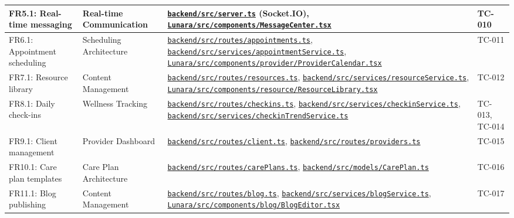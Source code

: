 \documentclass[12pt,letterpaper]{article}
\newcommand{\ghrepo}{https://github.com/omniV1/lunaraCare}
\begin{document}
{\begin{longtable}{|>{\raggedright\arraybackslash}p{2.2cm}|>{\raggedright\arraybackslash}p{2.5cm}|>{\raggedright\arraybackslash}p{5.5cm}|>{\raggedright\arraybackslash}p{2.5cm}|}
\hline
FR5.1: Real-time messaging & Real-time Communication & \href{\ghrepo/blob/main/backend/src/server.ts}{\texttt{backend/src/server.ts}} (Socket.IO), \href{\ghrepo/blob/main/Lunara/src/components/MessageCenter.tsx}{\texttt{Lunara/src/components/MessageCenter.tsx}} & TC-010 \\
\hline
\rowcolor{TableRowAlt}
FR6.1: Appointment scheduling & Scheduling Architecture & \href{\ghrepo/blob/main/backend/src/routes/appointments.ts}{\texttt{backend/src/routes/appointments.ts}}, \href{\ghrepo/blob/main/backend/src/services/appointmentService.ts}{\texttt{backend/src/services/appointmentService.ts}}, \href{\ghrepo/blob/main/Lunara/src/components/provider/ProviderCalendar.tsx}{\texttt{Lunara/src/components/provider/ProviderCalendar.tsx}} & TC-011 \\
\hline
FR7.1: Resource library & Content Management & \href{\ghrepo/blob/main/backend/src/routes/resources.ts}{\texttt{backend/src/routes/resources.ts}}, \href{\ghrepo/blob/main/backend/src/services/resourceService.ts}{\texttt{backend/src/services/resourceService.ts}}, \href{\ghrepo/blob/main/Lunara/src/components/resource/ResourceLibrary.tsx}{\texttt{Lunara/src/components/resource/ResourceLibrary.tsx}} & TC-012 \\
\hline
\rowcolor{TableRowAlt}
FR8.1: Daily check-ins & Wellness Tracking & \href{\ghrepo/blob/main/backend/src/routes/checkins.ts}{\texttt{backend/src/routes/checkins.ts}}, \href{\ghrepo/blob/main/backend/src/services/checkinService.ts}{\texttt{backend/src/services/checkinService.ts}}, \href{\ghrepo/blob/main/backend/src/services/checkinTrendService.ts}{\texttt{backend/src/services/checkinTrendService.ts}} & TC-013, TC-014 \\
\hline
FR9.1: Client management & Provider Dashboard & \href{\ghrepo/blob/main/backend/src/routes/client.ts}{\texttt{backend/src/routes/client.ts}}, \href{\ghrepo/blob/main/backend/src/routes/providers.ts}{\texttt{backend/src/routes/providers.ts}} & TC-015 \\
\hline
\rowcolor{TableRowAlt}
FR10.1: Care plan templates & Care Plan Architecture & \href{\ghrepo/blob/main/backend/src/routes/carePlans.ts}{\texttt{backend/src/routes/carePlans.ts}}, \href{\ghrepo/blob/main/backend/src/models/CarePlan.ts}{\texttt{backend/src/models/CarePlan.ts}} & TC-016 \\
\hline
FR11.1: Blog publishing & Content Management & \href{\ghrepo/blob/main/backend/src/routes/blog.ts}{\texttt{backend/src/routes/blog.ts}}, \href{\ghrepo/blob/main/backend/src/services/blogService.ts}{\texttt{backend/src/services/blogService.ts}}, \href{\ghrepo/blob/main/Lunara/src/components/blog/BlogEditor.tsx}{\texttt{Lunara/src/components/blog/BlogEditor.tsx}} & TC-017 \\

\end{longtable}}
\end{document}
